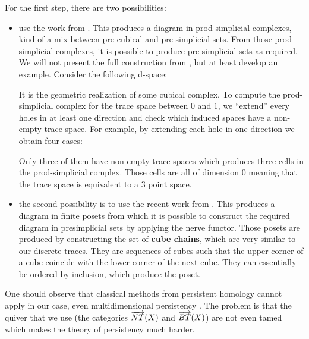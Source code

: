 	For the first step, there are two possibilities:
	\begin{itemize}
		\item use the work from \cite{raussen10}. This produces a diagram in prod-simplicial complexes, kind of a mix between pre-cubical and pre-simplicial sets. From those prod-simplicial complexes, it is possible to produce pre-simplicial sets as required. We will not present the full construction from \cite{raussen10}, but at least develop an example. Consider the following d-space:
		\begin{figure}[H]
  \begin{center}
    	
  \end{center}
\end{figure}
It is the geometric realization of some cubical complex. To compute the prod-simplicial complex for the trace space between $0$ and $1$, we ``extend'' every holes in at least one direction and check which induced spaces have a non-empty trace space. For example, by extending each hole in one direction we obtain four cases:
	\begin{figure}[H]
  \begin{center}
    	
  \end{center}
\end{figure}
	Only three of them have non-empty trace spaces which produces three cells in the prod-simplicial complex. Those cells are all of dimension $0$ meaning that the trace space is equivalent to a 3 point space.
		\item the second possibility is to use the recent work from \cite{ziemianski17}. This produces a diagram in finite posets from which it is possible to construct the required diagram in presimplicial sets by applying the nerve functor. Those posets are produced by constructing the set of \textbf{cube chains}, which are very similar to our discrete traces. They are sequences of cubes such that the upper corner of a cube coincide with the lower corner of the next cube. They can essentially be ordered by inclusion, which produce the poset.
	\end{itemize}
	
	One should observe that classical methods from persistent homology cannot apply in our case, even multidimensional persistency \cite{zomorodian05}. The problem is that the quiver that we use (the categories $\overrightarrow{NT}(X)$ and $\overrightarrow{BT}(X)$) are not even tamed which makes the theory of persistency much harder.
	
